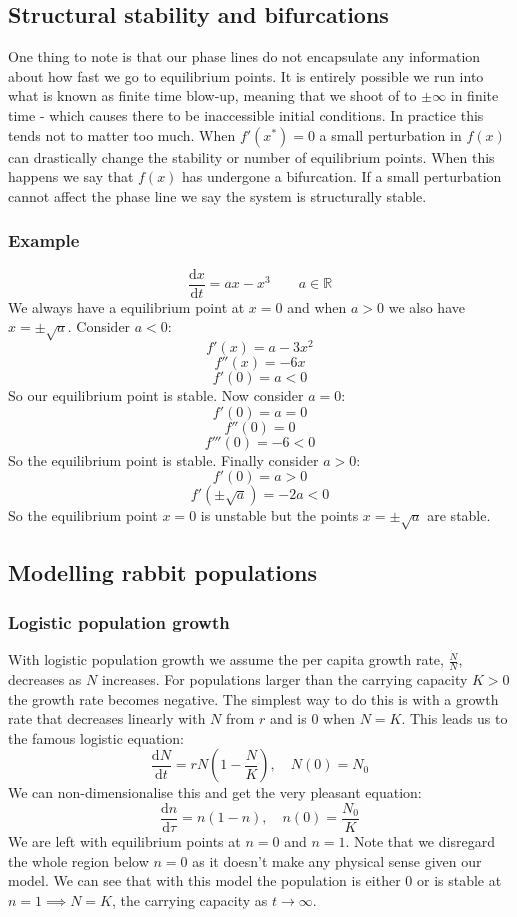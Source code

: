 \documentclass[12pt]{article}
\newcommand{\df}[2]{\frac{\text{d}#1}{\text{d}#2}}
\begin{document}
\subsection*{Structural stability and bifurcations}
One thing to note is that our phase lines do not encapsulate any information about how fast we go to equilibrium points. It is entirely possible we run into what is known as finite time blow-up, meaning that we shoot of to \(\pm\infty\) in finite time - which causes there to be inaccessible initial conditions. In practice this tends not to matter too much. When \(f'(x^*)=0\) a small perturbation in \(f(x)\) can drastically change the stability or number of equilibrium points. When this happens we say that \(f(x)\) has undergone a bifurcation. If a small perturbation cannot affect the phase line we say the system is structurally stable.
\subsubsection*{Example}
\[\df{x}{t}=ax-x^3\qquad a\in\mathbb{R}\]
We always have a equilibrium point at \(x=0\) and when \(a>0\) we also have \(x=\pm\sqrt{a}\). Consider \(a<0\):
\[f'(x)=a-3x^2\]
\[f''(x)=-6x\]
\[f'(0)=a<0\]
So our equilibrium point is stable. Now consider \(a=0\):
\[f'(0)=a=0\]
\[f''(0)=0\]
\[f'''(0)=-6<0\]
So the equilibrium point is stable. Finally consider \(a>0\):
\[f'(0)=a>0\]
\[f'(\pm\sqrt{a})=-2a<0\]
So the equilibrium point \(x=0\) is unstable but the points \(x=\pm\sqrt{a}\) are stable.
\subsection*{Modelling rabbit populations}
\subsubsection*{Logistic population growth}
With logistic population growth we assume the per capita growth rate, \(\frac{\dot{N}}{N}\), decreases as \(N\) increases. For populations larger than the carrying capacity \(K>0\) the growth rate becomes negative. The simplest way to do this is with a growth rate that decreases linearly with \(N\) from \(r\) and is \(0\) when \(N=K\). This leads us to the famous logistic equation:
\[\df{N}{t}=rN\left(1-\frac{N}{K}\right),\quad N(0)=N_0\]
We can non-dimensionalise this and get the very pleasant equation:
\[\df{n}{\tau}=n(1-n),\quad n(0)=\frac{N_0}{K}\]
We are left with equilibrium points at \(n=0\) and \(n=1\). Note that we disregard the whole region below \(n=0\) as it doesn't make any physical sense given our model. We can see that with this model the population is either \(0\) or is stable at \(n=1\implies N=K\), the carrying capacity as \(t\to\infty\).
\end{document}
